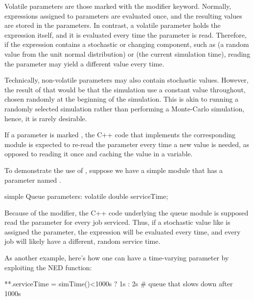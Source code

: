 Volatile parameters are those marked with the  modifier
keyword. Normally, expressions assigned to parameters are evaluated once, and
the resulting values are stored in the parameters. In contrast, a volatile
parameter holds the expression itself, and it is evaluated every time the
parameter is read. Therefore, if the expression contains a stochastic or
changing component, such as  (a random value from the unit
normal distribution) or  (the current simulation time), reading
the parameter may yield a different value every time.

\begin{note}
  Technically, non-volatile parameters may also contain stochastic values.
  However, the result of that would be that the simulation use a constant value
  throughout, chosen randomly at the beginning of the simulation. This is akin
  to running a randomly selected simulation rather than performing a Monte-Carlo
  simulation, hence, it is rarely desirable.
\end{note}

If a parameter is marked , the C++ code that implements the
corresponding module is expected to re-read the parameter every time a new value
is needed, as opposed to reading it once and caching the value in a variable.

To demonstrate the use of , suppose we have a 
simple module that has a  parameter named
.

\begin{ned}
simple Queue
{
    parameters:
        volatile double serviceTime;
}
\end{ned}

Because of the  modifier, the C++ code underlying the queue
module is supposed read the  parameter for every job serviced.
Thus, if a stochastic value like  is assigned the
parameter, the expression will be evaluated every time, and every job will
likely have a different, random service time.

As another example, here's how one can have a time-varying parameter by
exploiting the  NED function:

\begin{inifile}
**.serviceTime = simTime()<1000s ? 1s : 2s  # queue that slows down after 1000s
\end{inifile}


